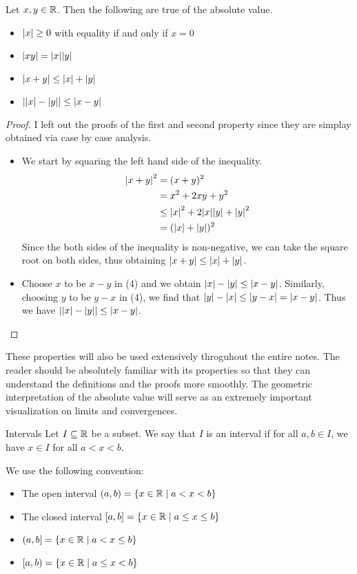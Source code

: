 \documentclass[a4paper]{article}
\begin{document}
\begin{prp}{}{} Let $x,y\in\mathbb{R}$. Then the following are true of the absolute value. 
\begin{itemize}
\item $\abs{x}\geq 0$ with equality if and only if $x=0$
\item $\abs{xy}=\abs{x}\abs{y}$
\item $\abs{x+y}\leq\abs{x}+\abs{y}$
\item $\abs{\abs{x}-\abs{y}}\leq\abs{x-y}$
\end{itemize}\tcbline
\begin{proof} I left out the proofs of the first and second property since they are simplay obtained via case by case analysis. 
\begin{itemize}
\item We start by squaring the left hand side of the inequality. 
\begin{align*}
\abs{x+y}^2&=(x+y)^2 \\
&=x^2+2xy+y^2 \\
&\leq \abs{x}^2+2\abs{x}\abs{y}+\abs{y}^2 \\
&=(\abs{x}+\abs{y})^2
\end{align*}
Since the both sides of the inequality is non-negative, we can take the square root on both sides, thus obtaining $\abs{x+y}\leq\abs{x}+\abs{y}$. 
\item Choose $x$ to be $x-y$ in (4) and we obtain $\abs{x}-\abs{y}\leq\abs{x-y}$. Similarly, choosing $y$ to be $y-x$ in (4), we find that $\abs{y}-\abs{x}\leq\abs{y-x}=\abs{x-y}$. Thus we have $\abs{\abs{x}-\abs{y}}\leq\abs{x-y}$. 
\end{itemize}
\end{proof}
\end{prp}

These properties will also be used extensively throguhout the entire notes. The reader should be absolutely familiar with its properties so that they can understand the definitions and the proofs more smoothly. The geometric interpretation of the absolute value will serve as an extremely important visualization on limits and convergences. 

\begin{defn}{Intervals}{} Let $I\subseteq\mathbb{R}$ be a subset. We say that $I$ is an interval if for all $a,b\in I$, we have $x\in I$ for all $a<x<b$. 
\end{defn}

We use the following convention: 
\begin{itemize}
\item The open interval $(a,b)=\{x\in\mathbb{R}\;|\;a<x<b\}$
\item The closed interval $[a,b]=\{x\in\mathbb{R}\;|\;a\leq x\leq b\}$
\item $(a,b]=\{x\in\mathbb{R}\;|\;a<x\leq b\}$
\item $[a,b)=\{x\in\mathbb{R}\;|\;a\leq x<b\}$
\end{itemize}
\end{document}

